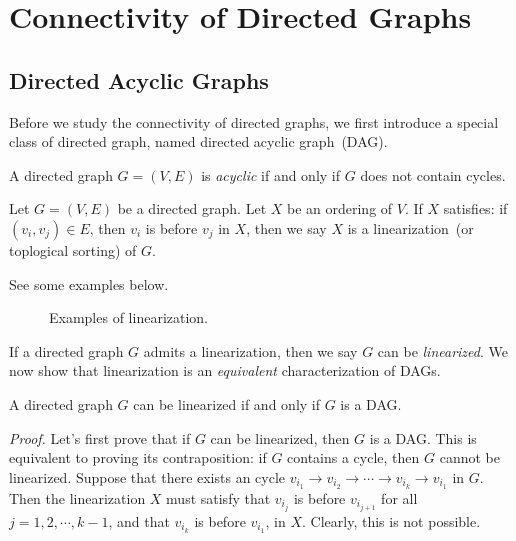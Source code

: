 \setcounter{definition}{0} \setcounter{property}{0} \setcounter{claim}{0} \setcounter{fact}{0} \setcounter{corollary}{0} \setcounter{figure}{0}
\section{Connectivity of Directed Graphs}

\subsection*{Directed Acyclic Graphs}

Before we study the connectivity of directed graphs, we first
introduce a special class of directed graph, named directed acyclic graph~(DAG).

\begin{definition}[DAG]
A directed graph $G = (V, E)$ is \emph{acyclic} if and only if $G$ does not contain cycles.
\end{definition}

\begin{definition}
Let $G = (V,E)$ be a directed graph. Let $X$ be an ordering of $V$.
If $X$ satisfies: if $(v_i, v_j)\in E$, then $v_i$ is before $v_j$ in $X$,
then we say $X$ is a linearization~(or toplogical sorting) of $G$.
\end{definition}


See some examples below.

\begin{figure}[h!]
\centering{}
\caption{Examples of linearization.}
\end{figure}

If a directed graph $G$ admits a linearization, then we say $G$ can be \emph{linearized}.
We now show that linearization is an \emph{equivalent} characterization of DAGs.

\begin{claim}
A directed graph $G$ can be linearized if and only if $G$ is a DAG.
\label{claim:dag}
\end{claim}

\emph{Proof.}  Let's first prove that if $G$ can be linearized, then $G$ is a DAG.
This is equivalent to proving its contraposition: if $G$ contains a cycle, then $G$ cannot be linearized.
Suppose that there exists an cycle $v_{i_1} \to v_{i_2} \to \cdots \to v_{i_k} \to v_{i_1}$ in $G$.
Then the linearization $X$ must satisfy that $v_{i_{j}}$ is before $v_{i_{j+1}}$ for all $j = 1, 2, \cdots, k-1$,
and that $v_{i_{k}}$ is before $v_{i_1}$, in $X$. Clearly, this is not possible.

